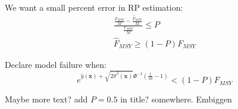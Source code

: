 \documentclass[a0paper,portrait]{baposter}
\begin{document}
\begin{poster}
{	%
	\begin{minipage}[h!]{0.39\textwidth}
	
	We want a small percent error in RP estimation:
	\begin{align*}
	\frac{\frac{F_{MSY}}{M}-\frac{\hat{F}_{MSY}}{M}}{\frac{F_{MSY}}{M}}\le P\\
	\hat{F}_{MSY}\ge(1-P)F_{MSY}
	\end{align*}
	
	Declare model failure when:
	\begin{equation*}
	e^{\hat y(\textbf{x}) + \sqrt{2\hat \sigma^2(\textbf{x})}\Phi^{-1}\left(\frac{1}{10}-1\right)}<(1-P)F_{MSY} 
	\end{equation*}
	
	{\color{red}Maybe more text? add $P=0.5$ in title? somewhere. Embiggen}
	
	\end{minipage}
        \begin{minipage}[h!]{0.61\textwidth}


\end{minipage}}
\end{poster}
\end{document}
